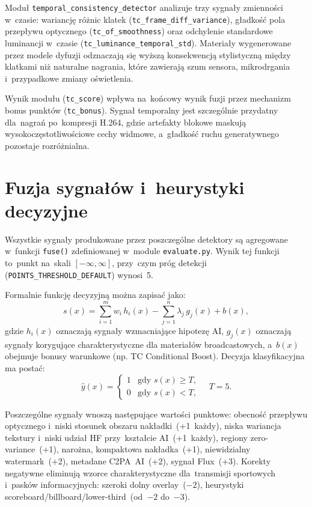 Moduł \texttt{temporal\_consistency\_detector} analizuje trzy sygnały
zmienności w~czasie: wariancję różnic klatek (\texttt{tc\_frame\_diff\_variance}),
gładkość pola przepływu optycznego (\texttt{tc\_of\_smoothness})
oraz odchylenie standardowe luminancji w~czasie (\texttt{tc\_luminance\_temporal\_std}).
Materiały wygenerowane przez modele dyfuzji odznaczają się wyższą
konsekwencją stylistyczną między klatkami niż naturalne nagrania,
które zawierają szum sensora, mikrodrgania i~przypadkowe zmiany oświetlenia.

Wynik modułu (\texttt{tc\_score}) wpływa na~końcowy wynik fuzji
przez mechanizm bonus punktów (\texttt{tc\_bonus}). Sygnał temporalny
jest szczególnie przydatny dla~nagrań po~kompresji H.264,
gdzie artefakty blokowe maskują wysokoczęstotliwościowe cechy widmowe,
a~gładkość ruchu generatywnego pozostaje rozróżnialna.

\section{Fuzja sygnałów i~heurystyki decyzyjne}

Wszystkie sygnały produkowane przez poszczególne detektory są agregowane
w~funkcji \texttt{fuse()} zdefiniowanej w~module \texttt{evaluate.py}.
Wynik tej funkcji to~punkt na~skali $[-\infty, \infty]$, przy~czym
próg detekcji (\texttt{POINTS\_THRESHOLD\_DEFAULT}) wynosi~5.

Formalnie funkcję decyzyjną można zapisać jako:
\[
s(x) = \sum_{i=1}^{m} w_i\,h_i(x) - \sum_{j=1}^{n} \lambda_j\,g_j(x) + b(x),
\]
gdzie $h_i(x)$ oznaczają sygnały wzmacniające hipotezę AI,
$g_j(x)$ oznaczają sygnały korygujące charakterystyczne dla materiałów
broadcastowych, a~$b(x)$ obejmuje bonusy warunkowe (np. TC Conditional Boost).
Decyzja klasyfikacyjna ma postać:
\[
\hat{y}(x)=\begin{cases}
1 & \text{gdy } s(x) \geq T,\\
0 & \text{gdy } s(x) < T,
\end{cases}
\quad T=5.
\]

Poszczególne sygnały wnoszą następujące wartości punktowe:
obecność przepływu optycznego i~niski stosunek obszaru nakładki~(+1~każdy),
niska wariancja tekstury i~niski udział HF przy~kształcie AI~(+1~każdy),
regiony zero-variance~(+1), narożna, kompaktowa nakładka~(+1),
niewidzialny watermark~(+2), metadane C2PA~AI~(+2), sygnał Flux~(+3).
Korekty negatywne eliminują wzorce charakterystyczne dla~transmisji sportowych
i~pasków informacyjnych: szeroki dolny overlay~($-2$), heurystyki
scoreboard/billboard/lower-third~(od~$-2$ do~$-3$).

